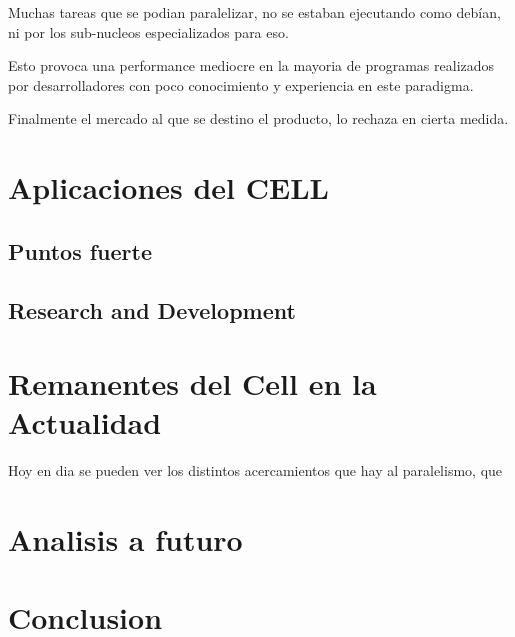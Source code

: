 \documentclass[11pt,compsoc]{IEEEtran}
\begin{document}
	Muchas tareas que se podian paralelizar, no se estaban ejecutando como debían, ni por los sub-nucleos especializados para eso. 
	
	Esto provoca una performance mediocre en la mayoria de programas realizados por desarrolladores con poco conocimiento y experiencia en este paradigma.
	
	Finalmente el mercado al que se destino el producto, lo rechaza en cierta medida.
		
	
	
	\section{Aplicaciones del CELL}
	\noindent 
	
	\subsection{Puntos fuerte}
	\noindent
	
	\subsection{Research and Development}
	\noindent
	
	
	
	\section{Remanentes del Cell en la Actualidad}%
	\noindent Hoy en dia se pueden ver los distintos acercamientos que hay al paralelismo, que 
	
	
	
	
	
	
	
	\section{Analisis a futuro}
	\noindent 
	
	
	
	
	
	
	\section{Conclusion}
	\noindent
	
\end{document}
